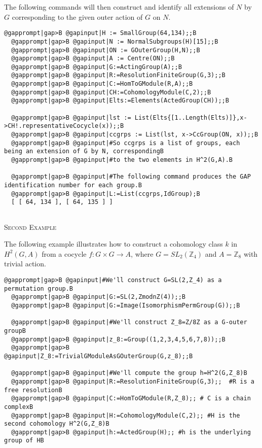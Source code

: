 \documentclass[a4paper,11pt]{report}
\begin{document}
{{\begin{Verbatim}[commandchars=@|B,fontsize=\small,frame=single,label=Example]
\end{Verbatim}
 

The following commands will then construct and identify all extensions of $N$ by $G$ corresponding to the given outer action of $G$ on $N$. 
\begin{Verbatim}[commandchars=@|B,fontsize=\small,frame=single,label=Example]
  @gapprompt|gap>B @gapinput|H := SmallGroup(64,134);;B
  @gapprompt|gap>B @gapinput|N := NormalSubgroups(H)[15];;B
  @gapprompt|gap>B @gapinput|ON := GOuterGroup(H,N);;B
  @gapprompt|gap>B @gapinput|A := Centre(ON);;B
  @gapprompt|gap>B @gapinput|G:=ActingGroup(A);;B
  @gapprompt|gap>B @gapinput|R:=ResolutionFiniteGroup(G,3);;B
  @gapprompt|gap>B @gapinput|C:=HomToGModule(R,A);;B
  @gapprompt|gap>B @gapinput|CH:=CohomologyModule(C,2);;B
  @gapprompt|gap>B @gapinput|Elts:=Elements(ActedGroup(CH));;B
  
  @gapprompt|gap>B @gapinput|lst := List(Elts{[1..Length(Elts)]},x->CH!.representativeCocycle(x));;B
  @gapprompt|gap>B @gapinput|ccgrps := List(lst, x->CcGroup(ON, x));;B
  @gapprompt|gap>B @gapinput|#So ccgrps is a list of groups, each being an extension of G by N, correspondingB
  @gapprompt|gap>B @gapinput|#to the two elements in H^2(G,A).B
  
  @gapprompt|gap>B @gapinput|#The following command produces the GAP identification number for each group.B
  @gapprompt|gap>B @gapinput|L:=List(ccgrps,IdGroup);B
  [ [ 64, 134 ], [ 64, 135 ] ]
  
\end{Verbatim}
 

\textsc{Second Example} 

The following example illustrates how to construct a cohomology class $k$ in $H^2(G, A)$ from a cocycle $f:G \times G \rightarrow A$, where $G=SL_2(\mathbb Z_4)$ and $A=\mathbb Z_8$ with trivial action. 
\begin{Verbatim}[commandchars=@|B,fontsize=\small,frame=single,label=Example]
  @gapprompt|gap>B @gapinput|#We'll construct G=SL(2,Z_4) as a permutation group.B
  @gapprompt|gap>B @gapinput|G:=SL(2,ZmodnZ(4));;B
  @gapprompt|gap>B @gapinput|G:=Image(IsomorphismPermGroup(G));;B
  
  @gapprompt|gap>B @gapinput|#We'll construct Z_8=Z/8Z as a G-outer groupB
  @gapprompt|gap>B @gapinput|z_8:=Group((1,2,3,4,5,6,7,8));;B
  @gapprompt|gap>B @gapinput|Z_8:=TrivialGModuleAsGOuterGroup(G,z_8);;B
  
  @gapprompt|gap>B @gapinput|#We'll compute the group h=H^2(G,Z_8)B
  @gapprompt|gap>B @gapinput|R:=ResolutionFiniteGroup(G,3);;  #R is a free resolutionB
  @gapprompt|gap>B @gapinput|C:=HomToGModule(R,Z_8);; # C is a chain complexB
  @gapprompt|gap>B @gapinput|H:=CohomologyModule(C,2);; #H is the second cohomology H^2(G,Z_8)B
  @gapprompt|gap>B @gapinput|h:=ActedGroup(H);; #h is the underlying group of HB
  

\end{Verbatim}}}
\end{document}
